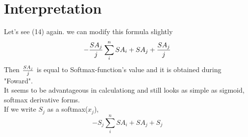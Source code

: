 \documentclass{article}
\begin{document}
\section{Interpretation}
Let's see (14) again. we can modify this formula slightly
\begin{equation}
    -{SA_j \over j}\sum_i^n {SA_i}+SA_j+{SA_j \over j}
\end{equation}
Then ${SA_j \over j}$ is equal to Softmax-function's value and it is obtained during "Foward".
\\
It seems to be advantageous in calculationg and still looks as simple as sigmoid, softmax derivative forms.
\\
If we write $S_j$ as a softmax($x_j$),
\begin{equation}
    -{S_j}\sum_i^n {SA_i}+SA_j+{S_j}
\end{equation}
\end{document}
